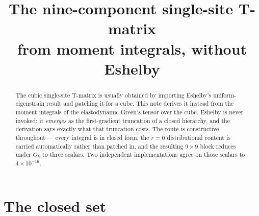 \documentclass[11pt,a4paper]{article}
\title{The nine-component single-site T-matrix\\ from moment integrals,
       without Eshelby}
\author{}
\date{}
\begin{document}
\maketitle

\begin{abstract}
The cubic single-site T-matrix is usually obtained by importing Eshelby's
uniform-eigenstrain result and patching it for a cube. This note derives it
instead from the moment integrals of the elastodynamic Green's tensor over the
cube. Eshelby is never invoked: it \emph{emerges} as the first-gradient
truncation of a closed hierarchy, and the derivation says exactly what that
truncation costs. The route is constructive throughout --- every integral is in
closed form, the $r=0$ distributional content is carried automatically rather
than patched in, and the resulting $9\times 9$ block reduces under $O_h$ to
three scalars. Two independent implementations agree on those scalars to
$4\times10^{-16}$.
\end{abstract}

\section{The closed set}
\end{document}
